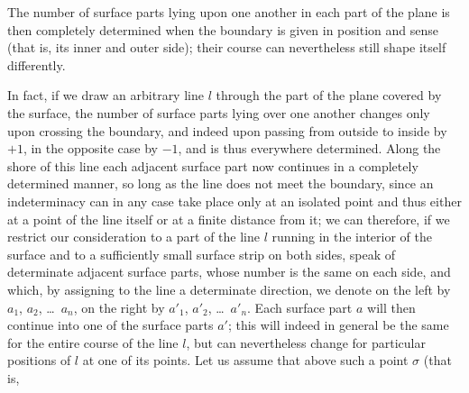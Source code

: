 \documentclass{article}
\begin{document}
The number of surface parts lying upon one another in each part of the plane is then completely determined when the boundary is given in position and sense (that is, its inner and outer side); their course can nevertheless still shape itself differently.

In fact, if we draw an arbitrary line $l$ through the part of the plane covered by the surface, the number of surface parts lying over one another changes only upon crossing the boundary, and indeed upon passing from outside to inside by $+1$, in the opposite case by $-1$, and is thus everywhere determined. Along the shore of this line each adjacent surface part now continues in a completely determined manner, so long as the line does not meet the boundary, since an indeterminacy can in any case take place only at an isolated point and thus either at a point of the line itself or at a finite distance from it; we can therefore, if we restrict our consideration to a part of the line $l$ running in the interior of the surface and to a sufficiently small surface strip on both sides, speak of determinate adjacent surface parts, whose number is the same on each side, and which, by assigning to the line a determinate direction, we denote on the left by $a_1$, $a_2$, \dots\ $a_n$, on the right by $a'_1$, $a'_2$, \dots\ $a'_n$. Each surface part $a$ will then continue into one of the surface parts $a'$; this will indeed in general be the same for the entire course of the line $l$, but can nevertheless change for particular positions of $l$ at one of its points. Let us assume that above such a point $\sigma$ (that is,
\end{document}
